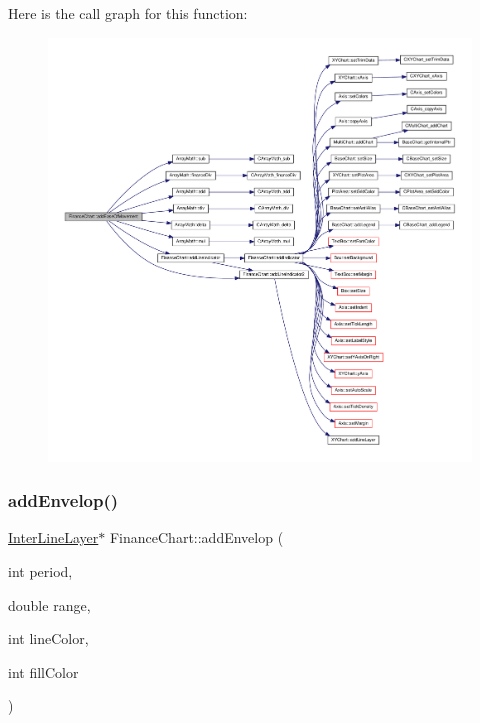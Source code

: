 Here is the call graph for this function\+:
\nopagebreak
\begin{figure}[H]
\begin{center}
\leavevmode
\includegraphics[width=350pt]{class_finance_chart_af821cff5482c9414a74be29646564d71_cgraph}
\end{center}
\end{figure}
\mbox{\label{class_finance_chart_a92bd5e67f5eaeb0fd801614c4ede9c43}} 
\subsubsection{\texorpdfstring{add\+Envelop()}{addEnvelop()}}
{\footnotesize\ttfamily \hyperlink{class_inter_line_layer}{Inter\+Line\+Layer}$\ast$ Finance\+Chart\+::add\+Envelop (\begin{DoxyParamCaption}\item[{int}]{period,  }\item[{double}]{range,  }\item[{int}]{line\+Color,  }\item[{int}]{fill\+Color }\end{DoxyParamCaption})\hspace{0.3cm}{\ttfamily [inline]}}



